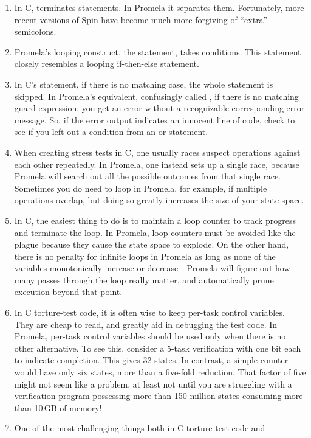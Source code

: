 \begin{enumerate}
\item	In C, \qco{;} terminates statements.
	In Promela it separates them.
	Fortunately, more recent versions of Spin have become
	much more forgiving of ``extra'' semicolons.
\item	Promela's looping construct, the  statement, takes
	conditions.
	This  statement closely resembles a looping if-then-else
	statement.
\item	In C's  statement, if there is no matching case, the whole
	statement is skipped.
	In Promela's equivalent, confusingly called , if there is
	no matching guard expression, you get an error without a
	recognizable corresponding error message.
	So, if the error output indicates an innocent line of code,
	check to see if you left out a condition from an  or 
	statement.
\item	When creating stress tests in C, one usually races suspect operations
	against each other repeatedly.
	In Promela, one instead sets up a single race, because Promela
	will search out all the possible outcomes from that single race.
	Sometimes you do need to loop in Promela, for example,
	if multiple operations overlap, but
	doing so greatly increases the size of your state space.
\item	In C, the easiest thing to do is to maintain a loop counter to track
	progress and terminate the loop.
	In Promela, loop counters must be avoided like the plague
	because they cause the state space to explode.
	On the other hand, there is no penalty for infinite loops in
	Promela as long as none of the variables monotonically increase
	or decrease---Promela will figure out how many passes through
	the loop really matter, and automatically prune execution beyond
	that point.
\item	In C torture-test code, it is often wise to keep per-task control
	variables.
	They are cheap to read, and greatly aid in debugging the test code.
	In Promela, per-task control variables should be used only when
	there is no other alternative.
	To see this, consider a 5-task verification with one bit each
	to indicate completion.
	This gives 32 states.
	In contrast, a simple counter would have only six states,
	more than a five-fold reduction.
	That factor of five might not seem like a problem, at least
	not until you are struggling with a verification program
	possessing more than 150 million states consuming more
	than 10\,GB of memory!
\item	One of the most challenging things both in C torture-test code and

\end{enumerate}
